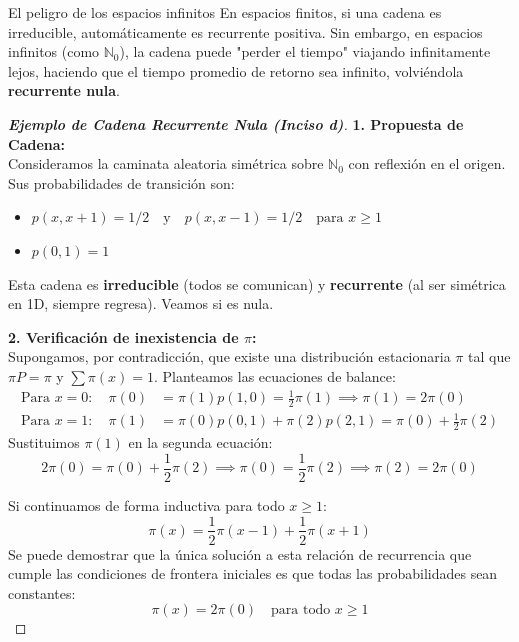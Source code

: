 \documentclass[10pt,a4paper]{article}
\begin{document}
\vspace{5mm}

\begin{alerta}{El peligro de los espacios infinitos}
    En espacios finitos, si una cadena es irreducible, automáticamente es recurrente positiva. Sin embargo, en espacios infinitos (como $\mathbb{N}_0$), la cadena puede "perder el tiempo" viajando infinitamente lejos, haciendo que el tiempo promedio de retorno sea infinito, volviéndola \textbf{recurrente nula}.
\end{alerta}

\begin{proof}[\textbf{Ejemplo de Cadena Recurrente Nula (Inciso d)}]
    \textbf{1. Propuesta de Cadena:} \\
    Consideramos la caminata aleatoria simétrica sobre $\mathbb{N}_0$ con reflexión en el origen. Sus probabilidades de transición son:
    \begin{itemize}
        \item $p(x, x+1) = 1/2 \quad \text{y} \quad p(x, x-1) = 1/2 \quad \text{para } x \ge 1$
        \item $p(0, 1) = 1$
    \end{itemize}
    Esta cadena es \textbf{irreducible} (todos se comunican) y \textbf{recurrente} (al ser simétrica en 1D, siempre regresa). Veamos si es nula.

    \textbf{2. Verificación de inexistencia de $\pi$:} \\
    Supongamos, por contradicción, que existe una distribución estacionaria $\pi$ tal que $\pi P = \pi$ y $\sum \pi(x) = 1$.
    Planteamos las ecuaciones de balance:
    \begin{align*}
        \text{Para } x = 0: \quad \pi(0) &= \pi(1) p(1,0) = \frac{1}{2}\pi(1) \implies \pi(1) = 2\pi(0) \\
        \text{Para } x = 1: \quad \pi(1) &= \pi(0) p(0,1) + \pi(2) p(2,1) = \pi(0) + \frac{1}{2}\pi(2)
    \end{align*}
    Sustituimos $\pi(1)$ en la segunda ecuación:
    \[ 2\pi(0) = \pi(0) + \frac{1}{2}\pi(2) \implies \pi(0) = \frac{1}{2}\pi(2) \implies \pi(2) = 2\pi(0) \]
    
    Si continuamos de forma inductiva para todo $x \ge 1$:
    \[ \pi(x) = \frac{1}{2}\pi(x-1) + \frac{1}{2}\pi(x+1) \]
    Se puede demostrar que la única solución a esta relación de recurrencia que cumple las condiciones de frontera iniciales es que todas las probabilidades sean constantes:
    \[ \pi(x) = 2\pi(0) \quad \text{para todo } x \ge 1 \]
    

\end{proof}
\end{document}
